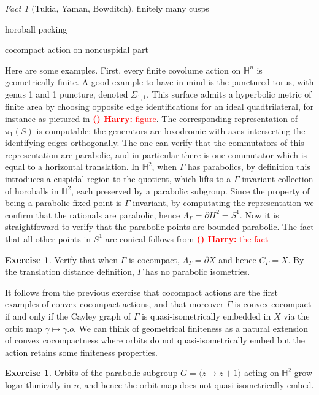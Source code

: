 \documentclass[11pt]{amsart}
\theoremstyle{plain}
\theoremstyle{definition}
\newtheorem{exercise}[proposition]{Exercise}
\theoremstyle{remark}
\newtheorem{fact}[proposition]{Fact}
\newcounter{countharry}
\newcommand{\comharry}[1]{{\textcolor{red}{\textrm{{\bf (\arabic{countharry})\stepcounter{countharry} Harry:} #1}}}}
\begin{document}
\begin{fact}[Tukia, Yaman, Bowditch]
  {\color{red}
    finitely many cusps

    horoball packing 

    cocompact action on noncuspidal part
  }
\end{fact}


Here are some examples.
First, every finite covolume action on $\mathbb H^n$ is geometrically
finite. 
A good example to have in mind is the punctured torus, with genus 1
and 1 puncture, denoted $\Sigma_{1,1}$. This surface 
admits a hyperbolic metric of
finite area by choosing opposite edge identifications for an ideal
quadtrilateral, for instance as
pictured in
\comharry{figure}. The corresponding representation of $\pi_1(S)$ is
computable; the generators are loxodromic with axes intersecting the
identifying edges orthogonally.
The one can verify that the commutators of this representation are parabolic,
and in particular there is one commutator which is equal to a horizontal
translation. 
In $\mathbb H^2$, when $\Gamma$ has parabolics, 
by definition this introduces a cuspidal region to the quotient, which
lifts to a $\Gamma$-invariant collection of horoballs in $\mathbb H^2$,
each preserved by a parabolic subgroup. 
Since the property of being a parabolic fixed point is
$\Gamma$-invariant,
by computating the representation we confirm that 
the rationals are parabolic, hence
$\Lambda_\Gamma=\partial H^2=S^1$. Now it is straightfoward to verify that
the parabolic points are bounded parabolic. The fact that all other points
in $S^1$ are conical follows from \comharry{the fact}

\begin{exercise}
Verify that 
when $\Gamma$ is cocompact, $\Lambda_\Gamma=\partial X$ and hence
$C_\Gamma=X$. By the translation distance definition, $\Gamma$ has no
parabolic isometries.  
\end{exercise}

It follows from the previous exercise 
that cocompact actions are the first examples of convex
cocompact actions, and that moreover 
$\Gamma$ is convex cocompact if and only if the Cayley graph of $\Gamma$
is quasi-isometrically embedded in $X$ via the orbit map
$\gamma\mapsto\gamma.o$. 
We can think of geometrical
finiteness as a natural extension of convex cocompactness 
where orbits do not quasi-isometrically
embed  but the action retains some
finiteness properties. 

\begin{exercise}
  Orbits of the parabolic subgroup $G=\langle z\mapsto z+1\rangle$  acting on
  $\mathbb H^2$ grow logarithmically in $n$, and hence the orbit map does
  not quasi-isometrically embed. 
\end{exercise}
\end{document}
